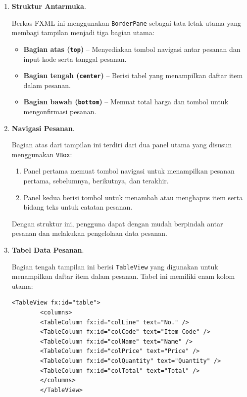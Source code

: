 \begin{enumerate}
	\item \textbf{Struktur Antarmuka}.
	
	Berkas FXML ini menggunakan \texttt{BorderPane} sebagai tata letak utama yang membagi tampilan menjadi tiga bagian utama:
	
	\begin{itemize}
		\item \textbf{Bagian atas (\texttt{top})} – Menyediakan tombol navigasi antar pesanan dan input kode serta tanggal pesanan.
		\item \textbf{Bagian tengah (\texttt{center})} – Berisi tabel yang menampilkan daftar item dalam pesanan.
		\item \textbf{Bagian bawah (\texttt{bottom})} – Memuat total harga dan tombol untuk mengonfirmasi pesanan.
	\end{itemize}
	
	\item \textbf{Navigasi Pesanan}.
	
	Bagian atas dari tampilan ini terdiri dari dua panel utama yang disusun menggunakan \texttt{VBox}:
	
	\begin{enumerate}
		\item Panel pertama memuat tombol navigasi untuk menampilkan pesanan pertama, sebelumnya, berikutnya, dan terakhir.
		\item Panel kedua berisi tombol untuk menambah atau menghapus item serta bidang teks untuk catatan pesanan.
	\end{enumerate}
	
	Dengan struktur ini, pengguna dapat dengan mudah berpindah antar pesanan dan melakukan pengelolaan data pesanan.
	
	\item \textbf{Tabel Data Pesanan}.
	
	Bagian tengah tampilan ini berisi \texttt{TableView} yang digunakan untuk menampilkan daftar item dalam pesanan. Tabel ini memiliki enam kolom utama:
	
	\begin{lstlisting}[style=XmlStyle]
		<TableView fx:id="table">
		<columns>
		<TableColumn fx:id="colLine" text="No." />
		<TableColumn fx:id="colCode" text="Item Code" />
		<TableColumn fx:id="colName" text="Name" />
		<TableColumn fx:id="colPrice" text="Price" />
		<TableColumn fx:id="colQuantity" text="Quantity" />
		<TableColumn fx:id="colTotal" text="Total" />
		</columns>
		</TableView>
	\end{lstlisting}
	

\end{enumerate}
